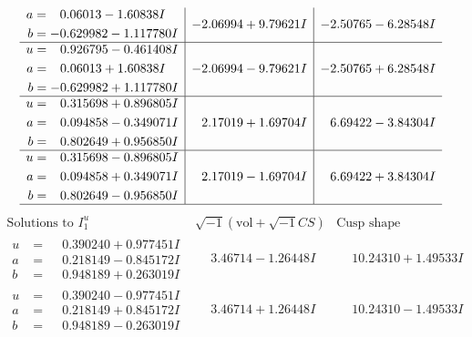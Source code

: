 \documentclass[1p]{elsarticle_modified}
\theoremstyle{definition}
\newcommand{\I}{\sqrt{-1}}
\begin{document}
$$\begin{array}{c|c|c}
\begin{aligned}
a &= \phantom{-}0.06013 - 1.60838 I \\
b &= -0.629982 - 1.117780 I\end{aligned}
 & -2.06994 + 9.79621 I & -2.50765 - 6.28548 I \\ \hline\begin{aligned}
u &= \phantom{-}0.926795 - 0.461408 I \\
a &= \phantom{-}0.06013 + 1.60838 I \\
b &= -0.629982 + 1.117780 I\end{aligned}
 & -2.06994 - 9.79621 I & -2.50765 + 6.28548 I \\ \hline\begin{aligned}
u &= \phantom{-}0.315698 + 0.896805 I \\
a &= \phantom{-}0.094858 - 0.349071 I \\
b &= \phantom{-}0.802649 + 0.956850 I\end{aligned}
 & \phantom{-}2.17019 + 1.69704 I & \phantom{-}6.69422 - 3.84304 I \\ \hline\begin{aligned}
u &= \phantom{-}0.315698 - 0.896805 I \\
a &= \phantom{-}0.094858 + 0.349071 I \\
b &= \phantom{-}0.802649 - 0.956850 I\end{aligned}
 & \phantom{-}2.17019 - 1.69704 I & \phantom{-}6.69422 + 3.84304 I\\
 \hline 
 \end{array}$$\newpage$$\begin{array}{c|c|c}  
\text{Solutions to }I^u_{1}& \I (\text{vol} + \sqrt{-1}CS) & \text{Cusp shape}\\
 \hline 
\begin{aligned}
u &= \phantom{-}0.390240 + 0.977451 I \\
a &= \phantom{-}0.218149 - 0.845172 I \\
b &= \phantom{-}0.948189 + 0.263019 I\end{aligned}
 & \phantom{-}3.46714 - 1.26448 I & \phantom{-}10.24310 + 1.49533 I \\ \hline\begin{aligned}
u &= \phantom{-}0.390240 - 0.977451 I \\
a &= \phantom{-}0.218149 + 0.845172 I \\
b &= \phantom{-}0.948189 - 0.263019 I\end{aligned}
 & \phantom{-}3.46714 + 1.26448 I & \phantom{-}10.24310 - 1.49533 I \\ \hline\begin{aligned}

\end{aligned}
\end{array}$$
\end{document}
